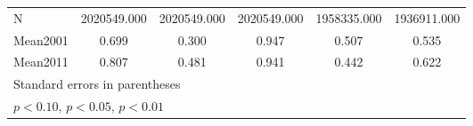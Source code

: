 {\begin{tabular}{l*{5}{c}}
\hline
N               &2020549.000         &2020549.000         &2020549.000         &1958335.000         &1936911.000         \\
Mean2001        &    0.699         &    0.300         &    0.947         &    0.507         &    0.535         \\
Mean2011        &    0.807         &    0.481         &    0.941         &    0.442         &    0.622         \\
\hline\hline
\multicolumn{6}{l}{\footnotesize Standard errors in parentheses}\\
\multicolumn{6}{l}{\footnotesize \sym{*} \(p<0.10\), \sym{**} \(p<0.05\), \sym{***} \(p<0.01\)}\\
\end{tabular}
}
